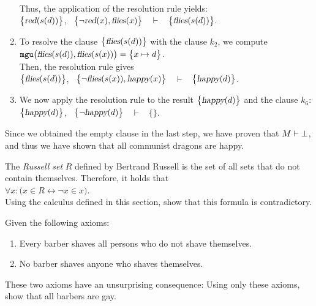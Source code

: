 \begin{enumerate}
      \\[0.2cm]
      Thus, the application of the resolution rule yields:
      \\[0.2cm]
      \hspace*{1.3cm}
      $\bigl\{\textsl{red}(s(d))\bigl\}$, \ $\bigl\{\neg \textsl{red}(x), \textsl{flies}(x)\bigl\}$ \ $\vdash$ \ $\bigl\{\textsl{flies}(s(d))\bigl\}$.
\item To resolve the clause $\bigl\{\textsl{flies}(s(d))\bigl\}$ with the clause $k_2$, we compute
      \\[0.2cm]
      \hspace*{1.3cm}
      $\mathtt{mgu}\bigl(\textsl{flies}(s(d)), \textsl{flies}(s(x))\bigr) = \bigl\{ x \mapsto d \bigr\}$.
      \\[0.2cm]
      Then, the resolution rule gives
      \\[0.2cm]
      \hspace*{1.3cm}
      $\bigl\{\textsl{flies}(s(d))\bigl\}$, \ $\bigl\{\neg \textsl{flies}(s(x)), \textsl{happy}(x)\bigl\}$ \ $\vdash$ \ $\bigl\{\textsl{happy}(d)\bigl\}$.
\item We now apply the resolution rule to the result $\bigl\{\textsl{happy}(d)\bigl\}$ and the clause $k_6$:
      \\[0.2cm]
      \hspace*{1.3cm}
      $\bigl\{\textsl{happy}(d)\bigl\}$, \ $\bigl\{\neg \textsl{happy}(d)\bigl\}$ \ $\vdash$ \ $\bigl\{\bigl\}$.
\end{enumerate}
Since we obtained the empty clause in the last step, we have proven that $M \vdash \bot$, and thus we have
shown that all communist dragons are happy. 
\eox

\exerciseEng
The \emph{Russell set} $R$ defined by Bertrand Russell is the set of all sets that do not contain themselves. Therefore, it holds that
\\[0.2cm]
\hspace*{1.3cm}
$\forall x: \bigl( x \in R \leftrightarrow \neg x \in x \bigr)$.
\\[0.2cm]
Using the calculus defined in this section, show that this formula is contradictory. \eox
\vspace{0.3cm}

\exerciseEng
Given the following axioms:
\begin{enumerate}
\item Every barber shaves all persons who do not shave themselves.
\item No barber shaves anyone who shaves themselves.
\end{enumerate}
These two axioms have an unsurprising consequence: Using only these axioms, show that all barbers are gay. \eox 

